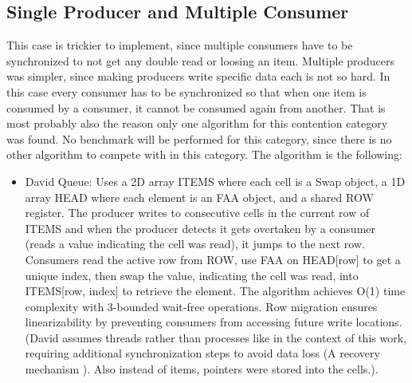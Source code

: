 \subsection{Single Producer and Multiple Consumer}\label{subsec:single-producer-and-multiple-consumer}
This case is trickier to implement, since multiple consumers have to be synchronized to not get any double read or loosing an item. Multiple producers was simpler, since making producers write specific data each is not so hard. In this case every consumer has to be synchronized so that when one item is consumed by a consumer, it cannot be consumed again from another. That is most probably also the reason only one algorithm for this contention category was found. No benchmark will be performed for this category, since there is no other algorithm to compete with in this category. The algorithm is the following:
\begin{itemize}
   \item David Queue: Uses a 2D array ITEMS where each cell is a Swap object, a 1D array HEAD where each element is an \ac{FAA} object, and a shared ROW register. The producer writes to consecutive cells in the current row of ITEMS and when the producer detects it gets overtaken by a consumer (reads a value indicating the cell was read), it jumps to the next row. Consumers read the active row from ROW, use \ac{FAA} on HEAD[row] to get a unique index, then swap the value, indicating the cell was read, into ITEMS[row, index] to retrieve the element. The algorithm achieves O(1) time complexity with 3-bounded wait-free operations. Row migration ensures linearizability by preventing consumers from accessing future write locations. (David assumes threads rather than processes like in the context of this work, requiring additional synchronization steps to avoid data loss (A recovery mechanism \cite{githubMA}).  Also instead of items, pointers were stored into the cells.). \cite{Mateíspmc}
\end{itemize}


